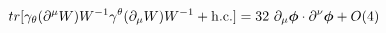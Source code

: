 \begin{equation}
tr[ \gamma_\theta (\partial^\mu W) W^{-1} \gamma^\theta (\partial_\mu W) W^{-1} +{\rm h.c.}] = 32~ \partial_\mu \mbox{\boldmath$\phi$} \cdot \partial^\nu \mbox{\boldmath$\phi$} +O(4)    \label{eq:v3}
\end{equation}

